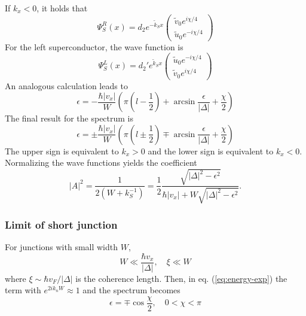 If $k_x < 0 $, it holds that
\begin{equation}
\Psi_S^R \left( x \right) = d_2 e^{ - \tilde{k}_S x } \begin{pmatrix} \tilde{v}_0 e^{i \chi/4} \\ \tilde{u}_0 e^{-i \chi/4} \end{pmatrix}
\end{equation}
For the left superconductor, the wave function is
\begin{equation}
\Psi_S^L \left( x \right)  = d_2' e^{ \tilde{k}_S x } \begin{pmatrix} \tilde{u}_0 e^{-i \chi / 4}\\ \tilde{v}_0 e^{i \chi / 4} \end{pmatrix}
\end{equation}
An analogous calculation leads to
\begin{equation}
\epsilon = - \frac{\hbar |v_x|}{W} \left( \pi \left(l - \frac{1}{2} \right) + \arcsin \frac{\epsilon}{|\Delta|} + \frac{\chi}{2} \right)
\end{equation}
The final result for the spectrum is
\begin{equation}
\epsilon = \pm \frac{\hbar |v_x|}{W} \left( \pi \left(l \pm \frac{1}{2} \right) \mp \arcsin \frac{\epsilon}{|\Delta|} + \frac{\chi}{2} \right)
\end{equation}
The upper sign is equivalent to $k_x > 0$ and the lower sign is equivalent to $k_x  <0 $.\\
Normalizing the wave functions yields the coefficient
\begin{equation}
|A|^2 = \frac{1}{2(W+ k_S^{-1})} = \frac{1}{2} \frac{\sqrt{|\Delta|^2 - \epsilon^2}}{\hbar |v_x| + W \sqrt{|\Delta|^2 - \epsilon^2}}.
\end{equation}
\subsubsection*{Limit of short junction}

For junctions with small width $W$,
\begin{equation}
W \ll \frac{\hbar v_x }{|\Delta|}, \quad \xi \ll W
\end{equation}
where $\xi \sim \hbar v_F / |\Delta|$ is the coherence length. Then, in eq. (\ref{eq:energy-exp}) the term with $e^{2i k_n W} \approx 1$ and the spectrum becomes
\begin{equation}
\epsilon = \mp \cos \frac{\chi}{2}, \quad 0 < \chi < \pi
\end{equation}

